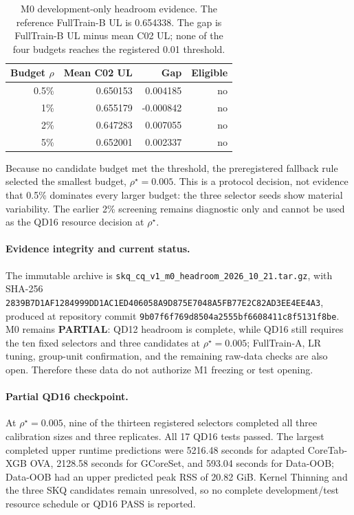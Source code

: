 \documentclass[runningheads]{llncs}
\begin{document}
\begin{table}[t]
\centering
\caption{M0 development-only headroom evidence.  The reference FullTrain-B UL
is 0.654338.  The gap is FullTrain-B UL minus mean C02 UL; none of the four
budgets reaches the registered 0.01 threshold.}
\label{tab:m0-headroom}
\begin{tabular}{rrrr}
\toprule
Budget $\rho$ & Mean C02 UL & Gap & Eligible \\
\midrule
0.5\% & 0.650153 &  0.004185 & no \\
1\%   & 0.655179 & -0.000842 & no \\
2\%   & 0.647283 &  0.007055 & no \\
5\%   & 0.652001 &  0.002337 & no \\
\bottomrule
\end{tabular}
\end{table}

Because no candidate budget met the threshold, the preregistered fallback rule
selected the smallest budget, $\rho^\star=0.005$.  This is a protocol decision,
not evidence that 0.5\% dominates every larger budget: the three selector seeds
show material variability.  The earlier 2\% screening remains diagnostic only
and cannot be used as the QD16 resource decision at $\rho^\star$.

\paragraph{Evidence integrity and current status.}
The immutable archive is
\nolinkurl{skq_cq_v1_m0_headroom_2026_10_21.tar.gz}, with SHA-256
\nolinkurl{2839B7D1AF1284999DD1AC1ED406058A9D875E7048A5FB77E2C82AD3EE4EE4A3},
produced at repository commit
\nolinkurl{9b07f6f769d8504a2555bf6608411c8f5131f8be}.  M0 remains
\textbf{PARTIAL}: QD12 headroom is complete, while QD16 still requires the ten
fixed selectors and three candidates at $\rho^\star=0.005$; FullTrain-A, LR
tuning, group-unit confirmation, and the remaining raw-data checks are also
open.  Therefore these data do not authorize M1 freezing or test opening.

\paragraph{Partial QD16 checkpoint.}
At $\rho^\star=0.005$, nine of the thirteen registered selectors completed all
three calibration sizes and three replicates.  All 17 QD16 tests passed.  The
largest completed upper runtime predictions were 5216.48 seconds for adapted
CoreTab-XGB OVA, 2128.58 seconds for GCoreSet, and 593.04 seconds for Data-OOB;
Data-OOB had an upper predicted peak RSS of 20.82 GiB.  Kernel Thinning and the
three SKQ candidates remain unresolved, so no complete development/test
resource schedule or QD16 PASS is reported.
\end{document}

